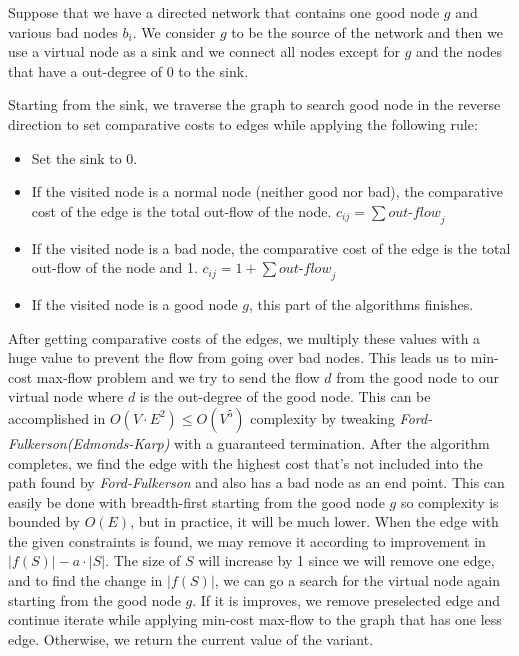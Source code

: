 Suppose that we have a directed network that contains one good node $g$ and various bad nodes $b_i$. We consider $g$ to be the source of the network and then we use a virtual node as a sink and we connect all nodes except for $g$ and the nodes that have a out-degree of 0 to the sink.

Starting from the sink, we traverse the graph to search good node in the reverse direction to set comparative costs to edges while applying the following rule:
\begin{itemize}
  \item Set the sink to 0.
  \item If the visited node is a normal node (neither good nor bad), the comparative cost of the edge is the total out-flow of the node. $c_{ij} = \sum \textit{out-flow}_j$
  \item If the visited node is a bad node, the comparative cost of the edge is the total out-flow of the node and 1. $c_{ij} = 1 + \sum \textit{out-flow}_j$
  \item If the visited node is a good node $g$, this part of the algorithms finishes.
\end{itemize}

After getting comparative costs of the edges, we multiply these values with a huge value to prevent the flow from going over bad nodes. This leads us to min-cost max-flow problem and we try to send the flow $d$ from the good node to our virtual node where $d$ is the out-degree of the good node. This can be accomplished in $O(V \cdot E^2) \leq O(V^5)$ complexity by tweaking \textit{Ford-Fulkerson(Edmonds-Karp)} with a guaranteed termination. After the algorithm completes, we find the edge with the highest cost that's not included into the path found by \textit{Ford-Fulkerson} and also has a bad node as an end point. This can easily be done with breadth-first starting from the good node $g$ so complexity is bounded by $O(E)$, but in practice, it will be much lower. When the edge with the given constraints is found, we may remove it according to improvement in $|f(S)| - a \cdot |S|$. The size of $S$ will increase by 1 since we will remove one edge, and to find the change in $|f(S)|$, we can go a search for the virtual node again starting from the good node $g$. If it is improves, we remove preselected edge and continue iterate while applying min-cost max-flow to the graph that has one less edge. Otherwise, we return the current value of the variant.